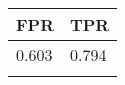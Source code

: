 \begin{tabular}{ll}
\hline
 FPR   & TPR   \\
\hline
 0.603 & 0.794 \\
       &       \\
\hline
\end{tabular}